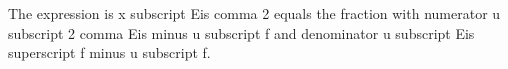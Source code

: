 The expression is x subscript Eis comma 2 equals the fraction with numerator u subscript 2 comma Eis minus u subscript f and denominator u subscript Eis superscript f minus u subscript f.